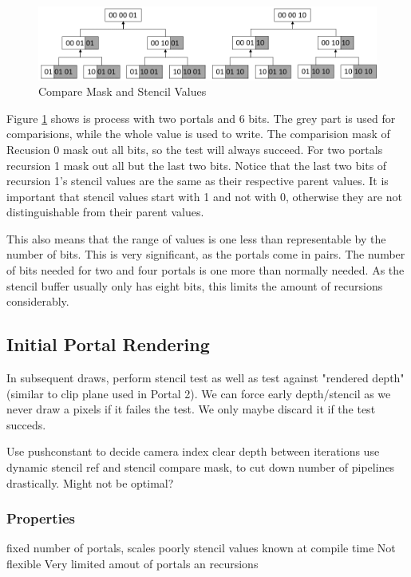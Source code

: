 \begin{figure}[h]
	\includegraphics[width=\linewidth]{images/stencilvalues2.png}
	\caption{Compare Mask and Stencil Values}
	\label{fig:stencilvalues}
\end{figure}

Figure \ref{fig:stencilvalues} shows is process with two portals and 6 bits. The grey part is used for comparisions, while the whole value is used to write. The comparision mask of Recusion 0 mask out all bits, so the test will always succeed. For two portals recursion 1 mask out all but the last two bits. Notice that the last two bits of  recursion 1's stencil values are the same as their respective parent values. It is important that stencil values start with 1 and not with 0, otherwise they are not distinguishable from their parent values.

This also means that the range of values is one less than representable by the number of bits. This is very significant, as the portals come in pairs. The number of bits needed for two and four portals is one more than normally needed. As the stencil buffer usually only has eight bits, this limits the amount of recursions considerably.







\subsection{Initial Portal Rendering}
In subsequent draws, perform stencil test as well as test against "rendered depth" (similar to clip plane used in Portal 2).
We can force early depth/stencil as we never draw a pixels if it failes the test. We only maybe discard it if the test succeds.

Use pushconstant to decide camera index
clear depth between iterations
use dynamic stencil ref and stencil compare mask, to cut down number of pipelines drastically. Might not be optimal?


\subsubsection{Properties}
fixed number of portals, scales poorly
stencil values known at compile time
Not flexible
Very limited amout of portals an recursions

